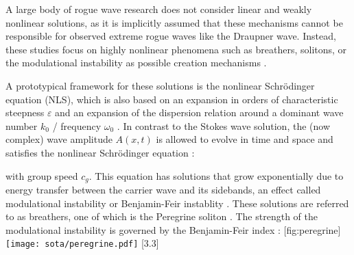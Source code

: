 A large body of rogue wave research does not consider linear and weakly nonlinear solutions, as it is implicitly assumed that these mechanisms cannot be responsible for observed extreme rogue waves like the Draupner wave. Instead, these studies focus on highly nonlinear phenomena such as breathers, solitons, or the modulational instability as possible creation mechanisms \citep[\eg][]{kharif_physical_2003,onorato_extreme_2006,onorato_approximate_2012,toffoli_evolution_2010,shukla_instability_2006,kharif_focusing_2001,dematteis_experimental_2019}.

A prototypical framework for these solutions is the nonlinear Schrödinger equation (NLS), which is also based on an expansion in orders of characteristic steepness $\varepsilon$ and an expansion of the dispersion relation around a dominant wave number $k_0$ / frequency $\omega_0$ \citep[see \eg][for a derivation]{johnson_modern_1997}. In contrast to the Stokes wave solution, the (now complex) wave amplitude $A(x, t)$ is allowed to evolve in time and space and satisfies the nonlinear Schrödinger equation \citep{slunyaev_rogue_2011}:


with group speed $c_g$. This equation has solutions that grow exponentially due to energy transfer between the carrier wave and its sidebands, an effect called modulational instability or Benjamin-Feir instablity \citep{benjamin_disintegration_1967}. These solutions are referred to as breathers, one of which is the Peregrine soliton \citep[]{peregrine_water_1983}. The strength of the modulational instability is governed by the Benjamin-Feir index \citep{alber_effects_1978}:
%
[fig:peregrine]{
    \texttt{[image: sota/peregrine.pdf]}
}[3.3]


